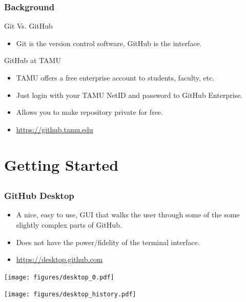 \documentclass[]{beamer}
\begin{document}
\begin{frame}[t]\frametitle{Background}
  \begin{block}{Git Vs. GitHub}
    \begin{itemize}
      \item Git is the version control software, GitHub is the interface.
    \end{itemize}
  \end{block}
  \begin{block}{GitHub at TAMU}
  \begin{itemize}
    \item TAMU offers a free enterprise account to students, faculty, etc.
    \item Just login with your TAMU NetID and password to GitHub Enterprise.
    \item Allows you to make repository private for free.
    \item \url{https://github.tamu.edu}
  \end{itemize}
\end{block}
\end{frame}

\section{Getting Started}
\subsection{}

\begin{frame}[t]\frametitle{GitHub Desktop}
\begin{block}{}
\begin{itemize}
  \item A nice, easy to use, GUI that walks the user through some of the some slightly complex parts of GitHub.
  \item Does not have the power/fidelity of the terminal interface.
  \item \url{https://desktop.github.com}
\end{itemize}
\end{block}
\end{frame}

\begin{frame}
\centering
\texttt{[image: figures/desktop\_0.pdf]}
\end{frame}

\begin{frame}
\centering
\texttt{[image: figures/desktop\_history.pdf]}
\end{frame}
\end{document}
